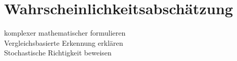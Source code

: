 \section{Wahrscheinlichkeitsabschätzung}

komplexer mathematischer formulieren\\
Vergleichsbasierte Erkennung erklären\\
Stochastische Richtigkeit beweisen\\


\begin{deprecated}
\cite{davis93}


\end{deprecated}

